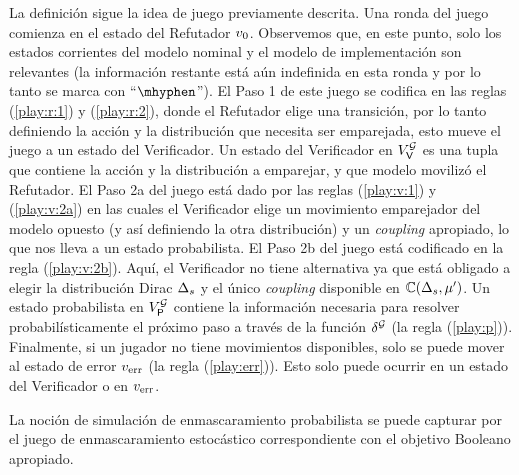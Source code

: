 La definición sigue la idea de juego previamente descrita. Una ronda del juego comienza en el estado del Refutador $v_0$.  Observemos que, en este punto, solo los estados corrientes del modelo nominal y el modelo de implementación son relevantes (la información restante está aún indefinida en esta ronda y por lo tanto se marca con ``$\mhyphen$'').  El Paso 1 de este juego se codifica en las reglas
(\ref{play:r:1}) y (\ref{play:r:2}), donde el Refutador elige una transición, por lo tanto definiendo la acción y la distribución que necesita ser emparejada,  esto mueve el juego a un estado del Verificador. Un estado del Verificador en $V^{\mathcal{G}}_{\mathsf{V}}$ es una tupla que contiene la acción y la distribución a emparejar, y que modelo movilizó el Refutador. El Paso 2a del juego está dado por las reglas (\ref{play:v:1}) y
(\ref{play:v:2a}) en las cuales el Verificador elige un movimiento emparejador del modelo opuesto (y así definiendo la otra distribución) y un \textit{coupling} apropiado, lo que nos lleva a un estado probabilista.  El Paso 2b
del juego está codificado en la regla (\ref{play:v:2b}).  Aquí, el Verificador no tiene alternativa ya que está obligado a elegir la distribución Dirac
$\Delta_s$ y el único \textit{coupling} disponible en
$\mathbb{C}(\Delta_s,\mu')$.  Un estado probabilista en
$V^{\mathcal{G}}_{\mathsf{P}}$ contiene la información necesaria para resolver probabilísticamente el próximo paso a través de la función $\delta^{\mathcal{G}}$ (la regla
(\ref{play:p})).
Finalmente, si un jugador no tiene movimientos disponibles, solo se puede mover al estado de error $v_{\text{err}}$ (la regla (\ref{play:err})). Esto solo puede ocurrir en un estado del Verificador o en
$v_{\text{err}}$.

La noción de simulación de enmascaramiento probabilista se puede capturar por el juego de enmascaramiento estocástico correspondiente con el objetivo Booleano apropiado.

